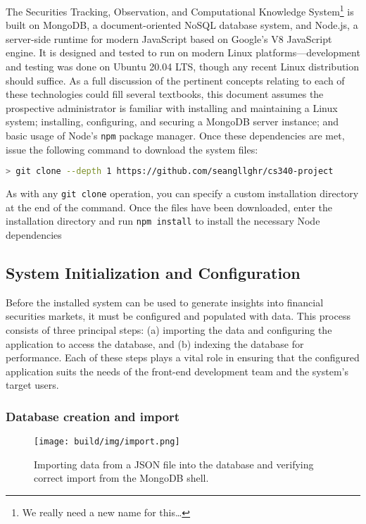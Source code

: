 \documentclass[
11pt,
titlepage,
]{article}
\begin{document}
The Securities Tracking, Observation, and Computational Knowledge
System\footnote{We really need a new name for this\ldots{}} is built on MongoDB,
a document-oriented NoSQL database system, and Node.js, a server-side runtime
for modern JavaScript based on Google's V8 JavaScript engine. It is designed and
tested to run on modern Linux platforms---development and testing was done on
Ubuntu 20.04 LTS, though any recent Linux distribution should suffice. As a full
discussion of the pertinent concepts relating to each of these technologies
could fill several textbooks, this document assumes the prospective
administrator is familiar with installing and maintaining a Linux system;
installing, configuring, and securing a MongoDB server instance; and basic usage
of Node's \texttt{npm} package manager. Once these dependencies are met, issue
the following command to download the system files:

\begin{lstlisting}[language=bash]
  > git clone --depth 1 https://github.com/seangllghr/cs340-project
\end{lstlisting}

\noindent As with any \texttt{git\ clone} operation, you can specify a custom
installation directory at the end of the command. Once the files have been
downloaded, enter the installation directory and run \texttt{npm\ install} to
install the necessary Node dependencies

\subsection{System Initialization and Configuration}

Before the installed system can be used to generate insights into financial
securities markets, it must be configured and populated with data. This process
consists of three principal steps: (a) importing the data and configuring the
application to access the database, and (b) indexing the database for
performance. Each of these steps plays a vital role in ensuring that the
configured application suits the needs of the front-end development team and the
system's target users.

\subsubsection{Database creation and import}

\begin{figure}[htbp]
  \texttt{[image: build/img/import.png]}
  \caption{Importing data from a JSON file into the database and verifying
    correct import from the MongoDB shell.}
  \label{fig:import}
\end{figure}
\end{document}
